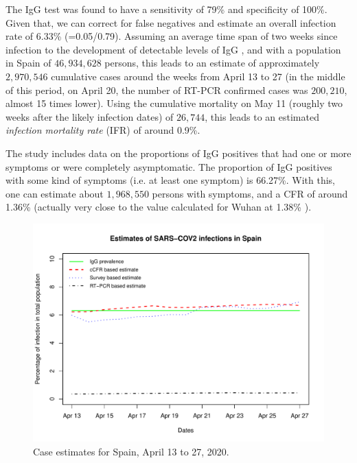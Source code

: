 \documentclass{article}
\begin{document}
The IgG test was found to have a sensitivity of 79\% and specificity of 100\%. Given that, we can correct for false negatives and estimate an overall infection rate of 6.33\% (=0.05/0.79). Assuming an average time span of two weeks since infection to the development of detectable levels of IgG \cite{long2020antibody}, and with a population in Spain of $46,934,628$ persons, this leads to an estimate of approximately $2,970,546$ cumulative cases around the weeks from April 13 to 27 (in the middle of this period, on April 20, the number of RT-PCR confirmed cases was $200,210$, almost 15 times lower). Using the cumulative mortality on May 11 (roughly two weeks after the likely infection dates) of $26,744$, this leads to an estimated \emph{infection mortality rate} (IFR) of around 0.9\%. 

The study includes data on the proportions of IgG positives that had one or more symptoms or were completely asymptomatic. The proportion of IgG positives with some kind of symptoms (i.e. at least one symptom) is 66.27\%. With this, one can estimate about $1,968,550$ persons with symptoms, and a CFR of around 1.36\% (actually very close to the value calculated for Wuhan at 1.38\% \cite{Verity2020}).


\begin{figure}[htb]
\begin{center}
\includegraphics[width=0.9\linewidth]{Calibration2.pdf}
\end{center}
\caption{Case estimates for Spain, April 13 to 27, 2020.}
\label{cal}
\end{figure}
\end{document}
